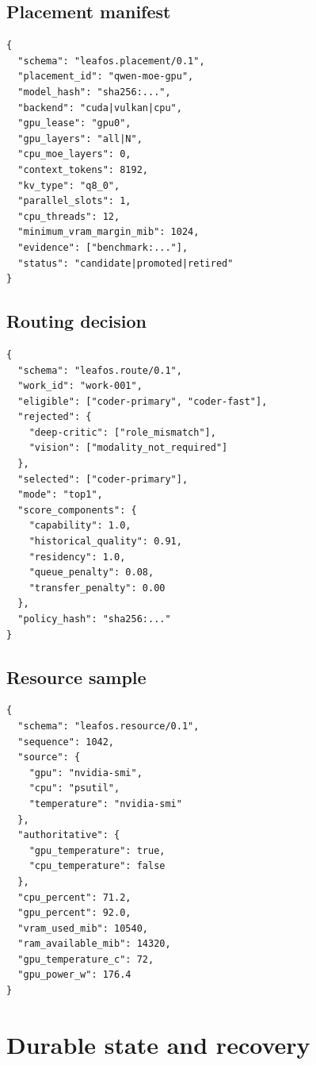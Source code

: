 \documentclass[11pt,letterpaper]{article}
\begin{document}
\subsection{Placement manifest}

\begin{lstlisting}
{
  "schema": "leafos.placement/0.1",
  "placement_id": "qwen-moe-gpu",
  "model_hash": "sha256:...",
  "backend": "cuda|vulkan|cpu",
  "gpu_lease": "gpu0",
  "gpu_layers": "all|N",
  "cpu_moe_layers": 0,
  "context_tokens": 8192,
  "kv_type": "q8_0",
  "parallel_slots": 1,
  "cpu_threads": 12,
  "minimum_vram_margin_mib": 1024,
  "evidence": ["benchmark:..."],
  "status": "candidate|promoted|retired"
}
\end{lstlisting}

\subsection{Routing decision}

\begin{lstlisting}
{
  "schema": "leafos.route/0.1",
  "work_id": "work-001",
  "eligible": ["coder-primary", "coder-fast"],
  "rejected": {
    "deep-critic": ["role_mismatch"],
    "vision": ["modality_not_required"]
  },
  "selected": ["coder-primary"],
  "mode": "top1",
  "score_components": {
    "capability": 1.0,
    "historical_quality": 0.91,
    "residency": 1.0,
    "queue_penalty": 0.08,
    "transfer_penalty": 0.00
  },
  "policy_hash": "sha256:..."
}
\end{lstlisting}

\subsection{Resource sample}

\begin{lstlisting}
{
  "schema": "leafos.resource/0.1",
  "sequence": 1042,
  "source": {
    "gpu": "nvidia-smi",
    "cpu": "psutil",
    "temperature": "nvidia-smi"
  },
  "authoritative": {
    "gpu_temperature": true,
    "cpu_temperature": false
  },
  "cpu_percent": 71.2,
  "gpu_percent": 92.0,
  "vram_used_mib": 10540,
  "ram_available_mib": 14320,
  "gpu_temperature_c": 72,
  "gpu_power_w": 176.4
}
\end{lstlisting}

\section{Durable state and recovery}
\end{document}
